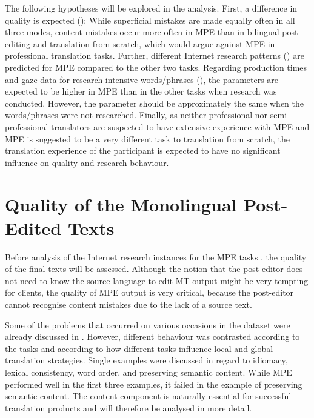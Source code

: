 \documentclass[output=paper]{langsci/langscibook}
\begin{document}
The following hypotheses will be explored in the analysis. First, a difference in quality is expected (): While superficial mistakes are made equally often in all three modes, content mistakes occur more often in MPE than in bilingual post-editing and translation from scratch, which would argue against MPE in professional translation tasks. Further, different Internet research patterns () are predicted for MPE compared to the other two tasks. Regarding production times and gaze data for research-intensive words/phrases (), the parameters are expected to be higher in MPE than in the other tasks when research was conducted. However, the parameter should be approximately the same when the words/phrases were not researched. Finally, as neither professional nor semi-professional translators are suspected to have extensive experience with MPE and MPE is suggested to be a very different task to translation from scratch, the translation experience of the participant is expected to have no significant influence on quality and research behaviour.


\section{Quality of the Monolingual Post-Edited Texts\label{nitzke:sec:QualityOfTheMonolingual}}

\largerpage
Before analysis of the Internet research instances for the MPE tasks , the quality of the final texts will be assessed. Although the notion that the post-editor does not need to know the source language to edit MT output might be very tempting for clients, the quality of MPE output is very critical, because the post-editor cannot recognise content mistakes due to the lack of a source text.


Some of the problems that occurred on various occasions in the dataset were already discussed in \citet{Culo2014}. However, different behaviour was contrasted according to the tasks and according to how different tasks influence local and global translation strategies. Single examples were discussed in regard to idiomacy, lexical consistency, word order, and preserving semantic content. While MPE performed well in the first three examples, it failed in the example of preserving semantic content. The content component is naturally essential for successful translation products and will therefore be analysed in more detail.
\end{document}
